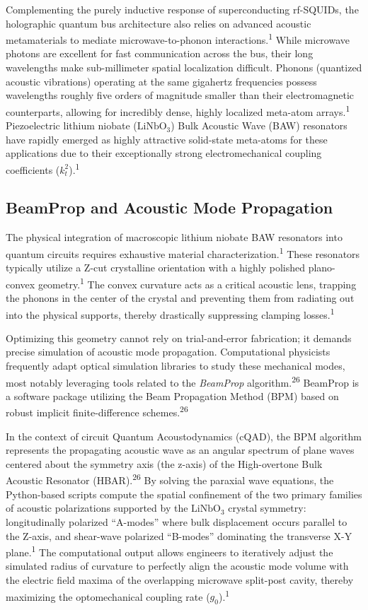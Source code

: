\documentclass[11pt, a4paper]{article}
\begin{document}
Complementing the purely inductive response of superconducting rf-SQUIDs, the holographic quantum bus architecture also relies on advanced acoustic metamaterials to mediate microwave-to-phonon interactions.\textsuperscript{1} While microwave photons are excellent for fast communication across the bus, their long wavelengths make sub-millimeter spatial localization difficult. Phonons (quantized acoustic vibrations) operating at the same gigahertz frequencies possess wavelengths roughly five orders of magnitude smaller than their electromagnetic counterparts, allowing for incredibly dense, highly localized meta-atom arrays.\textsuperscript{1} Piezoelectric lithium niobate ($\text{LiNbO}_3$) Bulk Acoustic Wave (BAW) resonators have rapidly emerged as highly attractive solid-state meta-atoms for these applications due to their exceptionally strong electromechanical coupling coefficients ($k_t^2$).\textsuperscript{1}

\subsection{BeamProp and Acoustic Mode Propagation}

The physical integration of macroscopic lithium niobate BAW resonators into quantum circuits requires exhaustive material characterization.\textsuperscript{1} These resonators typically utilize a Z-cut crystalline orientation with a highly polished plano-convex geometry.\textsuperscript{1} The convex curvature acts as a critical acoustic lens, trapping the phonons in the center of the crystal and preventing them from radiating out into the physical supports, thereby drastically suppressing clamping losses.\textsuperscript{1}

Optimizing this geometry cannot rely on trial-and-error fabrication; it demands precise simulation of acoustic mode propagation. Computational physicists frequently adapt optical simulation libraries to study these mechanical modes, most notably leveraging tools related to the \textit{BeamProp} algorithm.\textsuperscript{26} BeamProp is a software package utilizing the Beam Propagation Method (BPM) based on robust implicit finite-difference schemes.\textsuperscript{26}

In the context of circuit Quantum Acoustodynamics (cQAD), the BPM algorithm represents the propagating acoustic wave as an angular spectrum of plane waves centered about the symmetry axis (the z-axis) of the High-overtone Bulk Acoustic Resonator (HBAR).\textsuperscript{26} By solving the paraxial wave equations, the Python-based scripts compute the spatial confinement of the two primary families of acoustic polarizations supported by the $\text{LiNbO}_3$ crystal symmetry: longitudinally polarized ``A-modes'' where bulk displacement occurs parallel to the Z-axis, and shear-wave polarized ``B-modes'' dominating the transverse X-Y plane.\textsuperscript{1} The computational output allows engineers to iteratively adjust the simulated radius of curvature to perfectly align the acoustic mode volume with the electric field maxima of the overlapping microwave split-post cavity, thereby maximizing the optomechanical coupling rate ($g_0$).\textsuperscript{1}
\end{document}
